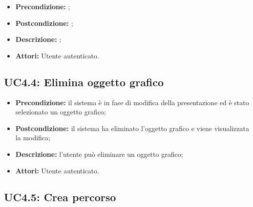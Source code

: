 \begin{itemize}
	\item \textbf{Precondizione:} ;
	\item \textbf{Postcondizione:} ;
	\item \textbf{Descrizione:} ;
	\item \textbf{Attori:} Utente autenticato.
\end{itemize}
\subsection{ UC4.4: Elimina oggetto grafico}

\begin{itemize}
	\item \textbf{Precondizione:} il sistema è in fase di modifica della presentazione ed è stato selezionato un oggetto grafico;
	\item \textbf{Postcondizione:} il sistema ha eliminato l'oggetto grafico e viene visualizzata la modifica;
	\item \textbf{Descrizione:} l'utente può eliminare un oggetto grafico;
	\item \textbf{Attori:} Utente autenticato.
\end{itemize}
\subsection{ UC4.5: Crea percorso}


